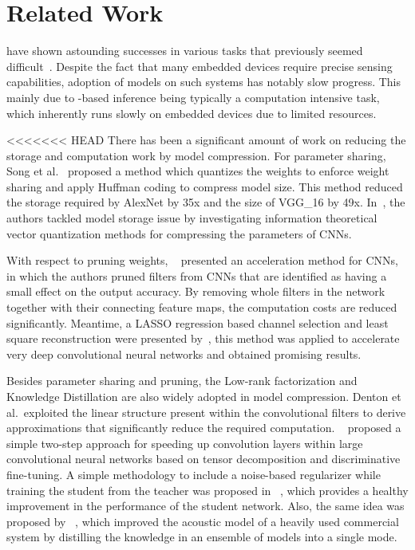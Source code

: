 \section{Related Work}
\DNNs have shown astounding successes in various tasks that previously seemed difficult~\cite{cho2014learning}. Despite the fact that many embedded
devices require precise sensing capabilities, adoption of \DNN models on such systems has notably slow progress. This mainly due to
\DNN-based inference being typically a computation intensive task, which inherently runs slowly on embedded devices due to limited
resources.

<<<<<<< HEAD
There has been a significant amount of work on reducing the storage and computation work by model compression.
For parameter sharing, Song et al.~\cite{han2015deep} proposed a method which quantizes the weights to enforce weight sharing and apply Huffman coding to compress model size. 
This method reduced the storage required by AlexNet by 35x and the size of VGG\_16 by 49x. In~\cite{Gong2014Compressing}, 
the authors tackled model storage issue by investigating information theoretical vector quantization methods for compressing the parameters of CNNs.

With respect to pruning weights, ~\cite{Li2016Pruning} presented an acceleration method for CNNs, in which the authors pruned filters from CNNs that are identified as having a small effect on the output accuracy. By removing whole filters in the network together with their connecting feature maps, the computation costs are reduced significantly. Meantime, a LASSO regression based channel selection and least square reconstruction were presented by~\cite{he2017channel}, this method was applied to accelerate very deep convolutional neural networks and obtained promising results.

Besides parameter sharing and pruning, the Low-rank factorization and Knowledge Distillation are also widely adopted in model compression. Denton et al.~\cite{denton2014exploiting}exploited the linear structure present within the convolutional filters to derive approximations that significantly reduce the required computation. ~\cite{lebedev2014speeding} proposed a simple two-step approach for speeding up convolution layers within large convolutional neural networks based on tensor decomposition and discriminative fine-tuning. A simple methodology to include a noise-based regularizer while training the student from the teacher was proposed in ~\cite{Sau2016Deep}, which provides a healthy improvement in the performance of the student network. Also, the same idea was proposed by ~\cite{Hinton2015Distilling}, which improved the acoustic model of a heavily used commercial system by distilling the knowledge in an ensemble of models into a single mode.

